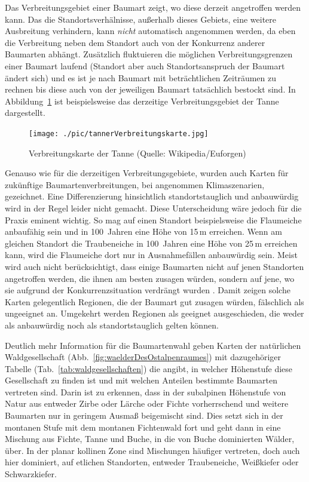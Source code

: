 \documentclass[twocolumn]{scrartcl}
\begin{document}
Das Verbreitungsgebiet einer Baumart zeigt, wo diese derzeit angetroffen werden
kann. Das die Standortsverhälnisse, außerhalb dieses Gebiets, eine weitere
Ausbreitung verhindern, kann \emph{nicht} automatisch angenommen werden, da eben
die Verbreitung neben dem Standort auch von der Konkurrenz anderer Baumarten
abhängt. Zusätzlich fluktuieren die möglichen Verbreitungsgrenzen einer Baumart
laufend (Standort aber auch Standortsanspruch der Baumart ändert sich) und es
ist je nach Baumart mit beträchtlichen Zeiträumen zu rechnen bis diese auch von
der jeweiligen Baumart tatsächlich bestockt sind. In
Abbildung~\ref{fig:tannerVerbreitungskarte} ist beispielsweise das derzeitige
Verbreitungsgebiet der Tanne dargestellt.

\begin{figure}[htbp]
  \centering
  \texttt{[image: ./pic/tannerVerbreitungskarte.jpg]}
  \caption{Verbreitungskarte der Tanne (Quelle: Wikipedia/Euforgen)}
  \label{fig:tannerVerbreitungskarte}
\end{figure}

Genauso wie für die derzeitigen Verbreitungsgebiete, wurden auch Karten für
zukünftige Baumartenverbreitungen, bei angenommen Klimaszenarien, gezeichnet.
Eine Differenzierung hinsichtlich standortstauglich und anbauwürdig wird in der
Regel leider nicht gemacht. Diese Unterscheidung wäre jedoch für die Praxis
eminent wichtig. So mag auf einen Standort beispielsweise die Flaumeiche
anbaufähig sein und in 100~Jahren eine Höhe von 15\,m erreichen. Wenn am
gleichen Standort die Traubeneiche in 100~Jahren eine Höhe von 25\,m erreichen
kann, wird die Flaumeiche dort nur in Ausnahmefällen anbauwürdig sein. Meist
wird auch nicht berücksichtigt, dass einige Baumarten nicht auf jenen Standorten
angetroffen werden, die ihnen am besten zusagen würden, sondern auf jene, wo sie
aufgrund der Konkurrenzsituation verdrängt wurden
\citep{lian2022BaVerbreitungOpt}. Damit zeigen solche Karten gelegentlich
Regionen, die der Baumart gut zusagen würden, fälschlich als ungeeignet an.
Umgekehrt werden Regionen als geeignet ausgeschieden, die weder als anbauwürdig
noch als standortstauglich gelten können.

Deutlich mehr Information für die Baumartenwahl geben Karten der
natürlichen Waldgesellschaft (Abb.~\ref{fig:waelderDesOstalpenraumes})
mit dazugehöriger Tabelle (Tab.~\ref{tab:waldgesellschaften}) die
angibt, in welcher Höhenstufe diese Gesellschaft zu finden ist und mit
welchen Anteilen bestimmte Baumarten vertreten sind. Darin ist zu
erkennen, dass in der subalpinen Höhenstufe von Natur aus entweder
Zirbe oder Lärche oder Fichte vorherrschend und weitere Baumarten nur
in geringem Ausmaß beigemischt sind. Dies setzt sich in der montanen
Stufe mit dem montanen Fichtenwald fort und geht dann in eine Mischung
aus Fichte, Tanne und Buche, in die von Buche dominierten Wälder,
über. In der planar kollinen Zone sind Mischungen häufiger vertreten,
doch auch hier dominiert, auf etlichen Standorten, entweder
Traubeneiche, Weißkiefer oder Schwarzkiefer.
\end{document}
